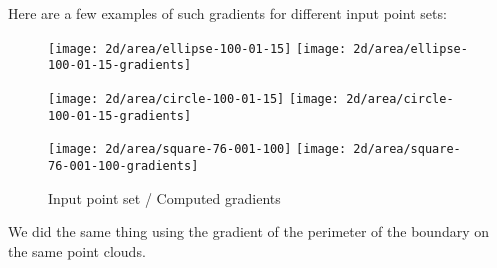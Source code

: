 Here are a few examples of such gradients for different input point sets:

\begin{figure}[H]
    \centering

    \begin{minipage}{0.8\linewidth}
        \centering
        \texttt{[image: 2d/area/ellipse-100-01-15]}
        \texttt{[image: 2d/area/ellipse-100-01-15-gradients]}
        \label{fig:gradients_area_2d_ellipse}
    \end{minipage}

    \begin{minipage}{0.8\linewidth}
        \centering
        \texttt{[image: 2d/area/circle-100-01-15]}
        \texttt{[image: 2d/area/circle-100-01-15-gradients]}
        \label{fig:gradients_area_2d_circle}
    \end{minipage}

    \begin{minipage}{0.8\linewidth}
        \centering
        \texttt{[image: 2d/area/square-76-001-100]}
        \texttt{[image: 2d/area/square-76-001-100-gradients]}
        \label{fig:gradients_area_2d_square}
    \end{minipage}

    \caption{Input point set / Computed gradients}
    \label{fig:gradients_area_2d}
\end{figure}

We did the same thing using the gradient of the perimeter of the boundary on the
same point clouds.

